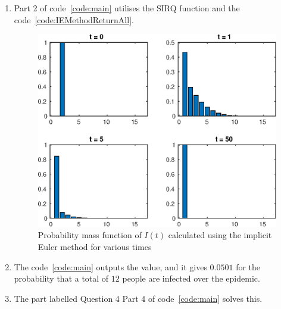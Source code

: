 \documentclass{/home/janmebows/Documents/LatexTemplates/myassignment}
\begin{document}
\begin{enumerate}
\begin{enumerate}[label=(\roman*)]
		\item %
				Part 2 of code~\ref{code:main} utilises the SIRQ function and the code~\ref{code:IEMethodReturnAll}. 

				\begin{figure}[tb]
					\centering
					\includegraphics[]{TopicBA2Q22.eps}
					\caption{Probability mass function of $I(t)$ calculated using the implicit Euler method for various times}
					\label{fig:detvsstoc}
				\end{figure}
		\item %
				The code~\ref{code:main} outputs the value, and it gives $0.0501$ for the probability that a total of $12$ people are infected over the epidemic. 

		\item %
				The part labelled Question 4 Part 4 of code~\ref{code:main} solves this. 


\end{enumerate}
\end{enumerate}
\end{document}
